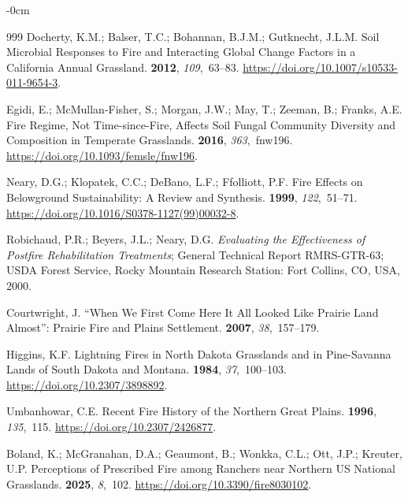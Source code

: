 \documentclass[fire,article,accept,oneauthor,pdftex]{Definitions/mdpi}
\begin{document}
\begin{adjustwidth}{-\extralength}{0cm}
\begin{thebibliography}{999}
Docherty, K.M.; Balser, T.C.; Bohannan, B.J.M.; Gutknecht, J.L.M.
\newblock Soil Microbial Responses to Fire and Interacting Global Change
  Factors in a {{California}} Annual Grassland.
 {\bf 2012}, {\em 109},~63--83.
\newblock
  \url{https://doi.org/10.1007/s10533-011-9654-3}.

Egidi, E.; {McMullan-Fisher}, S.; Morgan, J.W.; May, T.; Zeeman, B.; Franks,
  A.E.
\newblock Fire Regime, Not Time-since-Fire, Affects Soil Fungal Community
  Diversity and Composition in Temperate Grasslands.
 {\bf 2016}, {\em 363},~fnw196.
\newblock
  \url{https://doi.org/10.1093/femsle/fnw196}.

Neary, D.G.; Klopatek, C.C.; DeBano, L.F.; Ffolliott, P.F.
\newblock Fire Effects on Belowground Sustainability: A Review and Synthesis.
 {\bf 1999}, {\em 122},~51--71.
\newblock
  \url{https://doi.org/10.1016/S0378-1127(99)00032-8}.

Robichaud, P.R.; Beyers, J.L.; Neary, D.G.
\newblock \emph{Evaluating the Effectiveness of Postfire Rehabilitation Treatments};
\newblock General {{Technical Report}} RMRS-GTR-63; USDA Forest Service, Rocky
  Mountain Research Station: Fort Collins, CO, USA, 2000.

Courtwright, J.
\newblock ``{{When We First Come Here It All Looked Like Prairie Land
  Almost}}'': {{Prairie Fire}} and {{Plains Settlement}}.
 {\bf 2007}, {\em 38},~157--179.

Higgins, K.F.
\newblock Lightning {{Fires}} in {{North Dakota Grasslands}} and in
  {{Pine-Savanna Lands}} of {{South Dakota}} and {{Montana}}.
 {\bf 1984}, {\em 37},~100--103.
\newblock
  \url{https://doi.org/10.2307/3898892}.

Umbanhowar, C.E.
\newblock Recent {{Fire History}} of the {{Northern Great Plains}}.
 {\bf 1996}, {\em 135},~115. 
  \url{https://doi.org/10.2307/2426877}.

Boland, K.; McGranahan, D.A.; Geaumont, B.; Wonkka, C.L.; Ott, J.P.; Kreuter,
  U.P.
\newblock Perceptions of Prescribed Fire among Ranchers near Northern {{US
  National Grasslands}}.
 {\bf 2025}, {\em 8},~102.
\newblock
  \url{https://doi.org/10.3390/fire8030102}.


\end{thebibliography}
\end{adjustwidth}
\end{document}
